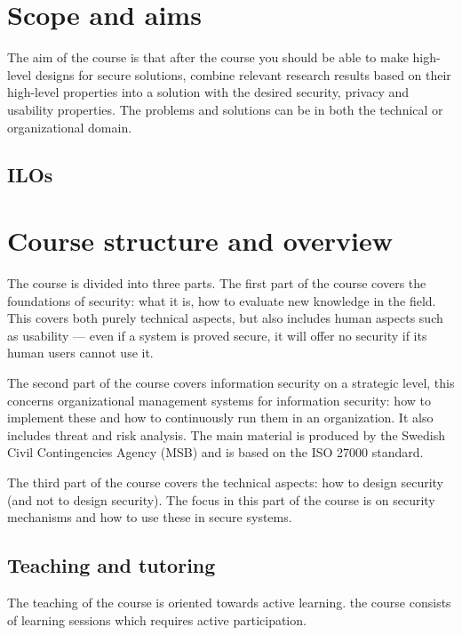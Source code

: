 \mode*

\section{Scope and aims}%
\label{sec:aim}
The aim of the course is that after the course you should be able to make 
high-level designs for secure solutions, \ie combine relevant research results 
based on their high-level properties into a solution with the desired security, 
privacy and usability properties.
The problems and solutions can be in both the technical or organizational 
domain.

\subsection{\Aclp*{ILO}}



\section{Course structure and overview}%
\label{CourseStructure}

The course is divided into three parts.
The first part of the course covers the foundations of security: what it is, 
how to evaluate new knowledge in the field.
This covers both purely technical aspects, but also includes human aspects such
as usability --- even if a system is proved secure, it will offer no security 
if its human users cannot use it.

The second part of the course covers information security on a strategic level, 
this concerns organizational management systems for information security: how 
to implement these and how to continuously run them in an organization.
It also includes threat and risk analysis.
The main material is produced by the Swedish Civil Contingencies Agency (MSB) 
and is based on the ISO 27000 standard.

The third part of the course covers the technical aspects: how to design 
security (and not to design security).
The focus in this part of the course is on security mechanisms and how to use 
these in secure systems.

\subsection{Teaching and tutoring}

The teaching of the course is oriented towards active learning.
\Ie the course consists of learning sessions which requires active 
participation.

